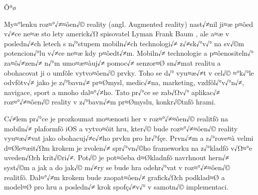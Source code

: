 \documentclass[twoside,12pt]{article}
\begin{document}
\def\,{\penalty10000\hskip.25em}
\pagestyle{headings}

\bakalarska





 
\newpage\null\thispagestyle{empty}\newpage




\obsah


Ôªø%
%

% 
My≈°lenku roz≈°√≠≈ôen√© reality (angl. Augmented reality) nast√≠nil ji≈æ p≈ôed v√≠ce ne≈æ sto lety americk√Ω spisovatel Lyman Frank Baum \cite{baum}, ale a≈æ v posledn√≠ch letech s n√°stupem mobiln√≠ch technologi√≠ z√≠sk√°v√° na sv√©m potencion√°lu v√≠ce ne≈æ kdy p≈ôedt√≠m. Mobiln√≠ technologie a p≈ôenositeln√° za≈ô√≠zen√≠ n√°m umo≈æ≈àuj√≠ pomoc√≠ senzor≈Ø sn√≠mat realitu a obohacovat ji o umƒõle vytvo≈ôen√© prvky. Toho se d√° vyu≈æ√≠t v cel√© ≈°k√°le odvƒõtv√≠ jako je z√°bavn√≠ pr≈Ømysl, medic√≠na, marketing, vzdƒõl√°v√°n√≠, navigace, sport a mnoho dal≈°√≠ho. Tato pr√°ce se zab√Ωv√° aplikac√≠ roz≈°√≠≈ôen√© reality v z√°bavn√≠m pr≈Ømyslu, konkr√©tnƒõ hrami. 

% 
C√≠lem pr√°ce je prozkoumat mo≈ænosti her v roz≈°√≠≈ôen√© realitƒõ na mobiln√≠ plaformƒõ iOS a vytvo≈ôit hru, kter√© bude roz≈°√≠≈ôen√© reality vyu≈æ√≠vat jako obohacuj√≠c√≠ho prvku pro hr√°ƒçe. Prvn√≠m a z√°rove≈à velmi d≈Øle≈æit√Ωm krokem je zvolen√≠ spr√°vn√©ho frameworku na z√°kladƒõ v√Ω≈°e uveden√Ωch krit√©ri√≠. Pot√© je pot≈ôeba d≈Økladnƒõ navrhnout hern√≠ syst√©m a jak a do jak√© m√≠ry se bude hra odehr√°vat v roz≈°√≠≈ôen√© realitƒõ. Dal≈°√≠m krokem bude zaopat≈ôen√≠ grafick√Ωch podklad≈Ø a model≈Ø pro hru a posledn√≠ krok spoƒç√≠v√° v samotn√© implementaci.
\end{document}
